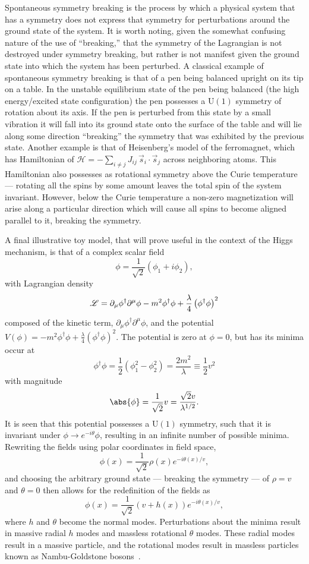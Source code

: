 Spontaneous symmetry breaking is the process by which a physical system that has a symmetry does not express that symmetry for perturbations around the ground state of the system.
It is worth noting, given the somewhat confusing nature of the use of ``breaking,'' that the symmetry of the Lagrangian is not destroyed under symmetry breaking, but rather is not manifest given the ground state into which the system has been perturbed.
A classical example of spontaneous symmetry breaking is that of a pen being balanced upright on its tip on a table.
In the unstable equilibrium state of the pen being balanced (the high energy/excited state configuration) the pen possesses a $\mathrm{U}(1)$ symmetry of rotation about its axis.
If the pen is perturbed from this state by a small vibration it will fall into its ground state onto the surface of the table and will lie along some direction ``breaking'' the symmetry that was exhibited by the previous state.
Another example is that of Heisenberg’s model of the ferromagnet, which has Hamiltonian of $\mathcal{H} = -\sum_{i\neq j} J_{ij}\,\vec{s}_{i} \cdot \vec{s}_{j}$ across neighboring atoms.
This Hamiltonian also possesses as rotational symmetry above the Curie temperature --- rotating all the spins by some amount leaves the total spin of the system invariant.
However, below the Curie temperature a non-zero magnetization will arise along a particular direction which will cause all spins to become aligned parallel to it, breaking the symmetry.

A final illustrative toy model, that will prove useful in the context of the Higgs mechanism, is that of a complex scalar field
\[
 \phi = \frac{1}{\sqrt{2}} \left(\phi_{1} + i \phi_{2}\right),
\]
with Lagrangian density
\[
 \mathscr{L} = \partial_{\mu}\phi^{\dagger}\partial^{\mu}\phi - m^{2}\phi^{\dagger}\phi + \frac{\lambda}{4} \left(\phi^{\dagger}\phi\right)^{2}
\]
composed of the kinetic term, $\partial_{\mu}\phi^{\dagger}\partial^{\mu}\phi$, and the potential $V\left(\phi\right) = -m^{2}\phi^{\dagger}\phi + \frac{\lambda}{4} \left(\phi^{\dagger}\phi\right)^{2}$.
The potential is zero at $\phi=0$, but has its minima occur at
\[
 \phi^{\dagger}\phi = \frac{1}{2}\left(\phi_{1}^{2} - \phi_{2}^{2}\right) = \frac{2m^2}{\lambda} \equiv \frac{1}{2}v^{2}
\]
with magnitude
\[
 \abs{\phi} = \frac{1}{\sqrt{2}}v = \frac{\sqrt{2} v}{\lambda^{1/2}}.
\]
It is seen that this potential possesses a $\mathrm{U}(1)$ symmetry, such that it is invariant under $\phi \to e^{-i\theta}\phi$, resulting in an infinite number of possible minima.
Rewriting the fields using polar coordinates in field space,
\[
 \phi(x) = \frac{1}{\sqrt{2}} \rho\left(x\right) e^{-i \theta(x)/v},
\]
and choosing the arbitrary ground state --- breaking the symmetry --- of $\rho=v$ and $\theta=0$ then allows for the redefinition of the fields as
\[
 \phi(x) = \frac{1}{\sqrt{2}} \left(v + h\left(x\right)\right) e^{-i \theta(x)/v},
\]
where $h$ and $\theta$ become the normal modes.
Perturbations about the minima result in massive radial $h$ modes and massless rotational $\theta$ modes.
These radial modes result in a massive particle, and the rotational modes result in massless particles known as Nambu-Goldstone bosons~\cite{Nambu:1960tm,Goldstone:1961eq}.

